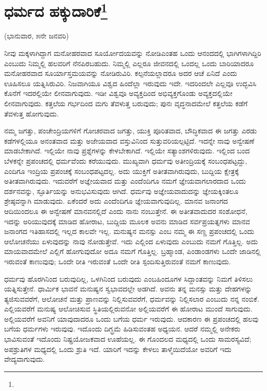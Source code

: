 
\chapter[ಧರ್ಮದ ಹಕ್ಕುದಾರಿಕೆ]{ಧರ್ಮದ ಹಕ್ಕುದಾರಿಕೆ\protect\footnote{}}

\begin{center}
(ಭಾನುವಾರ, ೫ನೇ ಜನವರಿ)
\end{center}

ನೀವು ಮಕ್ಕಳಾಗಿದ್ದಾಗ ಮನೋಹರವಾದ ಸೂರ್ಯೋದಯವನ್ನು ನೋಡಿ\break ಎಂತಹ ಒಂದು ಆನಂದದಲ್ಲಿ ಭಾಗಿಗಳಾಗಿದ್ದಿರಿ ಎಂಬುದು ನಿಮ್ಮಲ್ಲಿ ಹಲವರಿಗೆ ನೆನಪಿರಬಹುದು. ನಿಮ್ಮಲ್ಲಿ ಎಲ್ಲರೂ ಜೀವನದಲ್ಲಿ ಒಂದಲ್ಲ ಒಂದು ಬಾರಿಯಾದರೂ ಮನೋಹರವಾದ ಸೂರ್ಯಾಸ್ತಮಯವನ್ನು ನೋಡಿರುವಿರಿ. ಕಲ್ಪನೆಯಲ್ಲಾದರೂ ಅದರ ಆಚೆ ಏನಿದೆ ಎಂದು ಊಹಿಸಲೂ ಯತ್ನಿಸಿರುವಿರಿ. ನಿಜವಾಗಿಯೂ ವಿಶ್ವದ ಹಿಂದೆಲ್ಲಾ ಇರುವುದು ಇದೇ. ಇದರಿಂದಲೇ ಎಲ್ಲವೂ ಉದ್ಭವಿಸಿ ಕೊನೆಗೆ ಇದರಲ್ಲಿಯೇ ಲೀನವಾಗುವುದು. ಇಡೀ ವಿಶ್ವವೂ ಅವ್ಯಕ್ತದಿಂದ ಅಭಿವ್ಯಕ್ತಗೊಂಡು ಅವ್ಯಕ್ತದಲ್ಲಿಯೇ ಲೀನವಾಗುವುದು. ಕತ್ತಲೆಯ ಗರ್ಭದಿಂದ ಮಗು ತೆವಳುತ್ತ ಬರುವುದು; ಪುನಃ ವೃದ್ಧನಾದಮೇಲೆ ಕತ್ತಲೆಯ ಕಡೆಗೆ ತೆವಳುತ್ತ ಹೋಗುವುದು.

ನಮ್ಮ ಜಗತ್ತು, ಪಂಚೇಂದ್ರಿಯಗಳಿಗೆ ಗೋಚರವಾದ ಜಗತ್ತು, ಯುಕ್ತಿ ಪೂರಿತವಾದ, ಬೌದ್ಧಿಕವಾದ ಈ ಜಗತ್ತು ಎರಡು ಕಡೆಗಳಲ್ಲಿಯೂ ಅನಂತವಾದ ಮತ್ತು ಅಜೇಯವಾದ ವಸ್ತುವಿನಿಂದ ಸುತ್ತುವರಿಯಲ್ಪಟ್ಟಿದೆ. ಇದನ್ನೇ ನಾವು ಅನ್ವೇಷಣೆ ಮಾಡಬೇಕಾಗಿದೆ. ಇಲ್ಲಿಯೇ ನಾವು ಪ್ರಶ್ನೆಗಳನ್ನು ಕೇಳಬೇಕಾಗಿದೆ. ಇಲ್ಲಿಯೇ ಸತ್ಯಾಂಶಗಳಿರುವುದು. ಇಲ್ಲಿಂದ ಬಂದ ಬೆಳಕನ್ನೇ ಪ್ರಪಂಚದಲ್ಲಿ ಧರ್ಮವೆಂದು ಕರೆಯುವುದು. ಮುಖ್ಯವಾಗಿ ಧರ್ಮವು ಅತೀಂದ್ರಿಯಕ್ಕೆ ಸಂಬಂಧಪಟ್ಟದ್ದು, ಎಂದಿಗೂ ಇಂದ್ರಿಯ ಪ್ರಪಂಚಕ್ಕೆ ಸಂಬಂಧಪಟ್ಟದಲ್ಲ. ಅದು ಯುಕ್ತಿಗೆ ಅತೀತವಾಗಿರುವುದು, ಬುದ್ದಿಯ ಕ್ಷೇತ್ರಕ್ಕೆ ಅತೀತವಾಗಿರುವುದು. ಇದುವರೆಗೆ ಅಜ್ಞೇಯವಾದ ಮತ್ತು ಎಂದೆಂದಿಗೂ ನಮಗೆ ಜ್ಞೇಯವಾಗಲಾರದಾದ ಒಂದು ದರ್ಶನವನ್ನು, ಸ್ಫೂರ್ತಿಯನ್ನು ಅನುಭವಿಸುವುದು ಆಗಿದೆ. ಧರ್ಮವು ಅಜ್ಞೇಯವಾದುದನ್ನು ಜ್ಞೇಯಕ್ಕಿಂತಲೂ ಶ್ರೇಷ್ಠವನ್ನಾಗಿ ಮಾಡುವುದು. ಏಕೆಂದರೆ ಅದು ಎಂದೆಂದಿಗೂ ಜ್ಞೇಯವಾಗುವುದಿಲ್ಲ. ಮಾನವ ಜನಾಂಗದ ಆದಿಯಿಂದಲೂ ಈ ಅನ್ವೇಷಣೆ ಮಾನವನಲ್ಲಿದೆ ಎಂದು ನಾನು ನಂಬುತ್ತೇನೆ. ಈ ಅತೀತವಾದುದರ ಸಂಶೋಧನೆ, ಇದನ್ನು ಅರಿಯುವುದಕ್ಕೆ ಮಾಡಿದ ಹೋರಾಟ, ಬುದ್ದಿಯ ಮೂಲಕ ಅವನು ಮಾಡಿದ ಸರ್ವಪ್ರಯತ್ನಗಳು ಮಾನವ ಜನಾಂಗದ ಇತಿಹಾಸದಲ್ಲಿ ಇಲ್ಲದ ಕಾಲವೇ ಇಲ್ಲ. ಮನುಷ್ಯನ ಮನಸ್ಸು ಎಂಬ ನಮ್ಮ ಈ ಸಣ್ಣ ಪ್ರಪಂಚದಲ್ಲಿ ಒಂದು ಆಲೋಚನೆಯು ಏಳುವುದನ್ನು ನಾವು ನೋಡುತ್ತೇವೆ. ಇದು ಎಲ್ಲಿಂದ ಏಳುವುದು ಎಂಬುದು ನಮಗೆ ಗೊತ್ತಿಲ್ಲ. ಅದು ಮಾಯವಾದಮೇಲೆ ಎಲ್ಲಿಗೆ ಹೋಗುವುದೋ ಅದೂ ನಮಗೆ ಗೊತ್ತಿಲ್ಲ. ಬ್ರಹ್ಮಾಂಡ, ಪಿಂಡಾಂಡಗಳು ಒಂದೇ ಜಾಡಿನಲ್ಲಿ ಇರುವಂತೆ ಕಾಣುವುವು; ಒಂದೇ ರೀತಿ ಇರುವಂತೆ ಒಂದೇ ರೀತಿ ಸ್ಪಂದಿಸುತ್ತಿರುವಂತೆ ನಮಗೆ ಕಾಣುವುದು.

ಧರ್ಮವು ಹೊರಗಿನಿಂದ ಬರುವುದಿಲ್ಲ, ಒಳಗಿನಿಂದ ಬರುವುದು ಎಂಬ\break ಹಿಂದೂಗಳ ಸಿದ್ದಾಂತವನ್ನು ನಿಮಗೆ ತಿಳಿಸಲು ಯತ್ನಿಸುತ್ತೇನೆ. ಧಾರ್ಮಿಕ ಭಾವನೆ ಮನುಷ್ಯನ ಸ್ವಭಾವದಲ್ಲೇ ಅಡಗಿದೆ. ಅವನು ತನ್ನ ಮನಸ್ಸು ಮತ್ತು ದೇಹಗಳನ್ನು ತ್ಯಜಿಸುವವರೆಗೆ, ಆಲೋಚನೆ ಮತ್ತು ಪ್ರಾಣವನ್ನು ನಿಲ್ಲಿಸುವವರೆಗೆ, ಧರ್ಮವನ್ನು ನಿಲ್ಲಿಸಲಾರ ಎಂಬುದು ನನ್ನ ನಂಬಿಕೆ. ಎಲ್ಲಿಯವರೆಗೆ ಮನುಷ್ಯ ಆಲೋಚಿಸುವ ಸ್ಥಿತಿಯಲ್ಲಿರುವನೋ ಅಲ್ಲಿಯವರೆಗೆ ಈ ಹೋರಾಟ ಮುಂದೆ ಸಾಗುವುದು. ಅಲ್ಲಿಯವರೆಗೆ ಅವನಿಗೆ ಯಾವುದಾದರೂ ಒಂದು ಬಗೆಯ ಧರ್ಮ ಇರುವುದು. ಆದಕಾರಣ ಈ ಪ್ರಪಂಚದಲ್ಲಿ ಹಲವು ಬಗೆಯ ಧರ್ಮಗಳು ಇರುವುವು. ಇದೊಂದು ದಿಗ್ಭ್ರಮೆ ಹಿಡಿಸುವಂತಹ ಅಧ್ಯಯನ. ಆದರೆ ನಮ್ಮಲ್ಲಿ ಅನೇಕರು ಭಾವಿಸುವಂತೆ ಇದೊಂದು ನಿಷ್ಪ್ರಯೋಜಕವಾದ ಊಹೆಯಲ್ಲ. ಈ ಗೊಂದಲದ ಮಧ್ಯದಲ್ಲಿ ಒಂದು ಸಾಮರಸ್ಯವಿದೆ; ಅಪಶ್ರುತಿಗಳ ಮಧ್ಯದಲ್ಲಿ ಒಂದು ಶ್ರುತಿ ಇದೆ. ಯಾರಿಗೆ ಇದನ್ನು ಕೇಳಲು ತಾಳ್ಮೆಯಿದೆಯೋ ಅವರಿಗೆ ಇದು ವೇದ್ಯವಾಗುವುದು.

